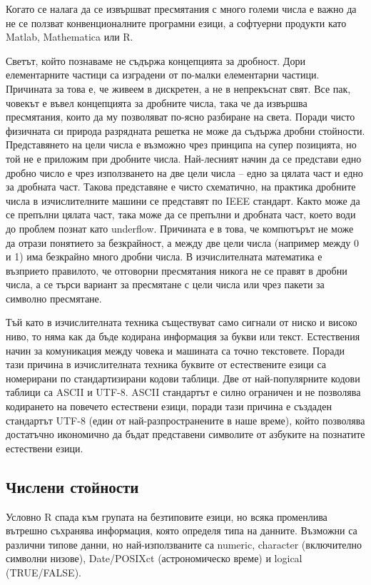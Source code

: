 Когато се налага да се извършват пресмятания с много големи числа е важно да не се ползват конвенционалните програмни езици, а софтуерни продукти като Matlab, Mathematica или R. 

Светът, който познаваме не съдържа концепцията за дробност. Дори елементарните частици са изградени от по-малки елементарни частици. Причината за това е, че живеем в дискретен, а не в непрекъснат свят. Все пак, човекът е въвел концепцията за дробните числа, така че да извършва пресмятания, които да му позволяват по-ясно разбиране на света. Поради чисто физичната си природа разрядната решетка не може да съдържа дробни стойности. Представянето на цели числа е възможно чрез принципа на супер позицията, но той не е приложим при дробните числа. Най-лесният начин да се представи едно дробно число е чрез използването на две цели числа – едно за цялата част и едно за дробната част. Такова представяне е чисто схематично, на практика дробните числа в изчислителните машини се представят по IEEE стандарт. Както може да се препълни цялата част, така може да се препълни и дробната част, което води до проблем познат като underflow. Причината е в това, че компютърът не може да отрази понятието за безкрайност, а между две цели числа (например между 0 и 1) има безкрайно много дробни числа. В изчислителната математика е възприето правилото, че отговорни пресмятания никога не се правят в дробни числа, а се търси вариант за пресмятане с цели числа или чрез пакети за символно пресмятане.

Тъй като в изчислителната техника съществуват само сигнали от ниско и високо ниво, то няма как да бъде кодирана информация за букви или текст. Естествения начин за комуникация между човека и машината са точно текстовете. Поради тази причина в изчислителната техника буквите от естествените езици са номерирани по стандартизирани кодови таблици. Две от най-популярните кодови таблици са ASCII и UTF-8. ASCII стандартът е силно ограничен и не позволява кодирането на повечето естествени езици, поради тази причина е създаден стандартът UTF-8 (един от най-разпространените в наше време), който позволява достатъчно икономично да бъдат представени символите от азбуките на познатите естествени езици.

\subsection{Числени стойности}

Условно R спада към групата на безтиповите езици, но всяка променлива вътрешно съхранява информация, която определя типа на данните. Възможни са различни типове данни, но най-използваните са numeric, character (включително символни низове), Date/POSIXct (астрономическо време) и logical (TRUE/FALSE). 

